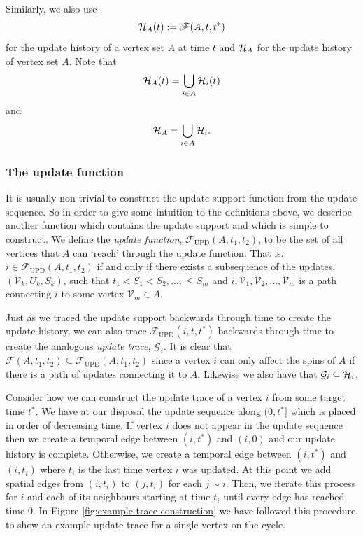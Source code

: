 	Similarly, we also use 
	\begin{equation}
		\mathcal{H}_A(t) := \mathscr{F}(A, t, t^*)
	\end{equation}
	for the update history of a vertex set $A$ at time $t$ and $\mathcal{H}_A$ for the update history of vertex set $A$. Note that
	\begin{equation}
		\mathcal{H}_A(t) = \bigcup_{i \in A} \mathcal{H}_i(t)
	\end{equation}
	and 
	\begin{equation}
		\mathcal{H}_A = \bigcup_{i \in A} \mathcal{H}_i.
	\end{equation}

	
	\subsubsection{The update function}
	\label{sec: definition update function}
	It is usually non-trivial to construct the update support function from the update sequence. So in order to give some intuition to the definitions above, we describe another function which contains the update support and which is simple to construct. We define the \emph{update function}, $\mathscr{F}_\mathrm{UPD}(A, t_1, t_2)$, to be the set of all vertices that $A$ can `reach' through the update function. That is, $i \in \mathscr{F}_\mathrm{UPD}(A, t_1, t_2)$ if and only if there exists a subsequence of the updates, $(\mathcal{V}_k, U_k, S_k)$, such that $t_1 < S_1 < S_2, \dots, \leq S_m$ and $i, \mathcal{V}_1, \mathcal{V}_2, \dots, \mathcal{V}_m$ is a path connecting $i$ to some vertex $\mathcal{V}_m \in A$. 

	Just as we traced the update support backwards through time to create the update history, we can also trace $\mathscr{F}_\mathrm{UPD}(i, t, t^*)$ backwards through time to create the analogous \emph{update trace}, $\mathcal{G}_i$. It is clear that $\mathscr{F}(A, t_1, t_2) \subseteq \mathscr{F}_\mathrm{UPD}(A, t_1, t_2)$ since a vertex $i$ can only affect the spins of $A$ if there is a path of updates connecting it to $A$. Likewise we also have that $\mathcal{G}_i \subseteq \mathcal{H}_i$.
	
	Consider how we can construct the update trace of a vertex $i$ from some target time $t^*$. We have at our disposal the update sequence along $(0, t^*]$ which is placed in order of decreasing time. If vertex $i$ does not appear in the update sequence then we create a temporal edge between $(i, t^*)$ and $(i, 0)$ and our update history is complete. Otherwise, we create a temporal edge between $(i, t^*)$ and $(i, t_i)$ where $t_i$ is the last time vertex $i$ was updated. At this point we add spatial edges from $(i, t_i)$ to $(j, t_i)$ for each $j\sim i$. Then, we iterate this process for $i$ and each of its neighbours starting at time $t_i$ until every edge has reached time $0$. In Figure \ref{fig:example trace construction} we have followed this procedure to show an example update trace for a single vertex on the cycle. 

